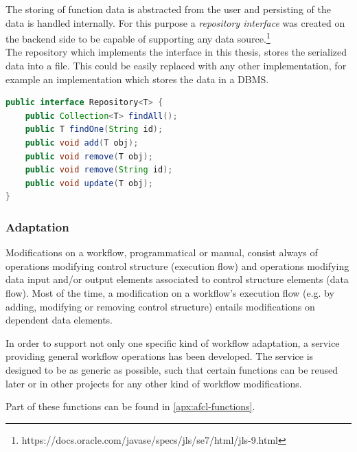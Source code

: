 \documentclass[a4paper,top=25mm,bottom=25mm,12pt,pdftex,halfparskip,twoside,bibtotoc,numbers=noenddot]{scrbook}
\begin{document}
The storing of function data is abstracted from the user and persisting of the data is handled internally. For this purpose a \textit{repository interface} was created on the backend side to be capable of supporting any data source.\footnote{https://docs.oracle.com/javase/specs/jls/se7/html/jls-9.html}\\
The repository which implements the interface in this thesis, stores the serialized data into a file. This could be easily replaced with any other implementation, for example an implementation which stores the data in a DBMS.

\vspace{0.25cm}
\begin{lstlisting}[language=Java, caption=Repository Interface]
public interface Repository<T> {
    public Collection<T> findAll();
    public T findOne(String id);
    public void add(T obj);
    public void remove(T obj);
    public void remove(String id);
    public void update(T obj);
}
\end{lstlisting}

\newpage

\subsubsection{Adaptation}
\label{sec:backend-adaptation}

Modifications on a workflow, programmatical or manual, consist always of operations modifying control structure (execution flow) and operations modifying data input and/or output elements associated to control structure elements (data flow). Most of the time, a modification on a workflow's execution flow (e.g. by adding, modifying or removing control structure) entails modifications on dependent data elements.

In order to support not only one specific kind of workflow adaptation, a service providing general workflow operations has been developed. The service is designed to be as generic as possible, such that certain functions can be reused later or in other projects for any other kind of workflow modifications. 

Part of these functions can be found in \ref{apx:afcl-functions}.


%
\end{document}
